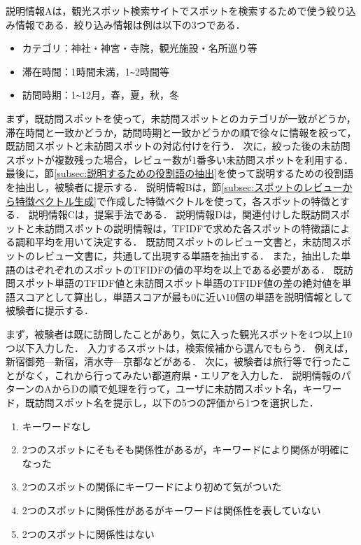 \documentclass{deimj}
\begin{document}
説明情報Aは，観光スポット検索サイトでスポットを検索するためで使う絞り込み情報である．絞り込み情報は例は以下の3つである．
\begin{itemize}
 \item カテゴリ：神社・神宮・寺院，観光施設・名所巡り等
 \item 滞在時間：1時間未満，1\verb|~|2時間等
 \item 訪問時期：1\verb|~|12月，春，夏，秋，冬
\end{itemize}
まず，既訪問スポットを使って，未訪問スポットとのカテゴリが一致がどうか，滞在時間と一致かどうか，訪問時期と一致かどうかの順で徐々に情報を絞って，既訪問スポットと未訪問スポットの対応付けを行う．
次に，絞った後の未訪問スポットが複数残った場合，レビュー数が1番多い未訪問スポットを利用する．
最後に，節\ref{subsec:説明するための役割語の抽出}を使って説明するための役割語を抽出し，被験者に提示する．
説明情報Bは，節\ref{subsec:スポットのレビューから特徴ベクトル生成}で作成した特徴ベクトルを使って，各スポットの特徴とする．
説明情報Cは，提案手法である．
説明情報Dは，関連付けした既訪問スポットと未訪問スポットの説明情報は，TFIDFで求めた各スポットの特徴語による調和平均を用いて決定する．
既訪問スポットのレビュー文書と，未訪問スポットのレビュー文書に，共通して出現する単語を抽出する．
また，抽出した単語のはぞれぞれのスポットのTFIDFの値の平均を以上である必要がある．
既訪問スポット単語のTFIDF値と未訪問スポット単語のTFIDF値の差の絶対値を単語スコアとして算出し，単語スコアが最も0に近い10個の単語を説明情報として被験者に提示する．

まず，被験者は既に訪問したことがあり，気に入った観光スポットを4つ以上10つ以下入力した．
入力するスポットは，検索候補から選んでもらう．
例えば，新宿御苑---新宿，清水寺---京都などがある．
次に，被験者は旅行等で行ったことがなく，これから行ってみたい都道府県・エリアを入力した．
説明情報のパターンのAからDの順で処理を行って，ユーザに未訪問スポット名，キーワード，既訪問スポット名を提示し，以下の5つの評価から1つを選択した．
\begin{enumerate}
  \item キーワードなし
  \item 2つのスポットにそもそも関係性があるが，キーワードにより関係が明確になった
  \item 2つのスポットの関係にキーワードにより初めて気がついた
  \item 2つのスポットに関係性があるがキーワードは関係性を表していない
  \item 2つのスポットに関係性はない
\end{enumerate}
\end{document}
